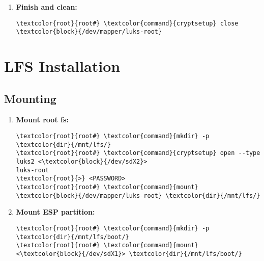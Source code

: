 \documentclass[10pt, a4paper, onecolumn, oneside, titlepage, openany]{book}
\begin{document}
\begin{enumerate}
\begin{enumerate}
\begin{Verbatim}[commandchars=\\\{\}]
\textcolor{root}{root#} \textcolor{command}{mkfs.btrfs} \textcolor{block}{/dev/mapper/luks-root}
\textcolor{root}{root#} \textcolor{command}{btrfs} filesystem label \textcolor{block}{/dev/mapper/luks-root}
LUKS-ROOT
\textcolor{root}{root#} \textcolor{command}{btrfstune} -U 00000000-0000-0000-0000-000000000003
\textcolor{block}{/dev/mapper/luks-root}
\textcolor{root}{>} y
\textcolor{root}{root#} \textcolor{command}{btrfs} check -p \textcolor{block}{/dev/mapper/luks-root} ; \textcolor{command}{echo} \$?
\end{Verbatim}
    \end{enumerate}
    \item \textbf{Finish and clean:}
\begin{Verbatim}[commandchars=\\\{\}]
\textcolor{root}{root#} \textcolor{command}{cryptsetup} close \textcolor{block}{/dev/mapper/luks-root}
\end{Verbatim}
\end{enumerate}


\chapter{LFS Installation}
\section{Mounting}
\begin{enumerate}
    \item \textbf{Mount root fs:}
\begin{Verbatim}[commandchars=\\\{\}]
\textcolor{root}{root#} \textcolor{command}{mkdir} -p \textcolor{dir}{/mnt/lfs/}
\textcolor{root}{root#} \textcolor{command}{cryptsetup} open --type luks2 <\textcolor{block}{/dev/sdX2}>
luks-root
\textcolor{root}{>} <PASSWORD>
\textcolor{root}{root#} \textcolor{command}{mount} \textcolor{block}{/dev/mapper/luks-root} \textcolor{dir}{/mnt/lfs/}
\end{Verbatim}
    \item \textbf{Mount ESP partition:}
\begin{Verbatim}[commandchars=\\\{\}]
\textcolor{root}{root#} \textcolor{command}{mkdir} -p \textcolor{dir}{/mnt/lfs/boot/}
\textcolor{root}{root#} \textcolor{command}{mount} <\textcolor{block}{/dev/sdX1}> \textcolor{dir}{/mnt/lfs/boot/}
\end{Verbatim}
\end{enumerate}
\end{document}
